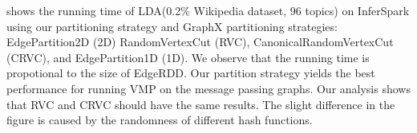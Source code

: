  shows the running time of LDA(0.2\% Wikipedia dataset, 96 topics) on InferSpark
using our partitioning strategy  and 
GraphX partitioning strategies: 
EdgePartition2D  (2D)
RandomVertexCut (RVC),
CanonicalRandomVertexCut (CRVC), and
EdgePartition1D (1D).
We observe that the running time is propotional to the size of EdgeRDD.
Our partition strategy yields the best performance for running VMP on the
message passing graphs.  Our analysis shows that RVC and CRVC should have the
same results. The slight difference in the figure is caused by the randomness
of different hash functions.




%
%



